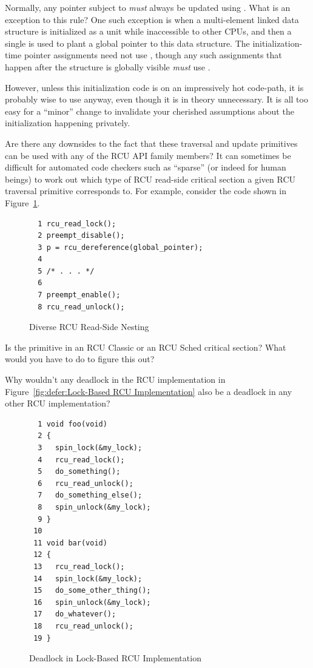 \QuickQ{}
	Normally, any pointer subject to  \emph{must}
	always be updated using .
	What is an exception to this rule?
\QuickA{}
	One such exception is when a multi-element linked
	data structure is initialized as a unit while inaccessible to other
	CPUs, and then a single  is used
	to plant a global pointer to this data structure.
	The initialization-time pointer assignments need not use
	, though any such assignments that
	happen after the structure is globally visible \emph{must} use
	.

	However, unless this initialization code is on an impressively hot
	code-path, it is probably wise to use 
	anyway, even though it is in theory unnecessary.
	It is all too easy for a ``minor'' change to invalidate your cherished
	assumptions about the initialization happening privately.

\QuickQ{}
	Are there any downsides to the fact that these traversal and update
	primitives can be used with any of the RCU API family members?
\QuickA{}
	It can sometimes be difficult for automated
	code checkers such as ``sparse'' (or indeed for human beings) to
	work out which type of RCU read-side critical section a given
	RCU traversal primitive corresponds to.
	For example, consider the code shown in
	Figure~\ref{fig:defer:Diverse RCU Read-Side Nesting}.

\begin{figure}[htbp]
{ \centering
\begin{verbatim}
  1 rcu_read_lock();
  2 preempt_disable();
  3 p = rcu_dereference(global_pointer);
  4
  5 /* . . . */
  6
  7 preempt_enable();
  8 rcu_read_unlock();
\end{verbatim}
}
\caption{Diverse RCU Read-Side Nesting}
\label{fig:defer:Diverse RCU Read-Side Nesting}
\end{figure}

	Is the  primitive in an RCU Classic
	or an RCU Sched critical section?
	What would you have to do to figure this out?

\QuickQ{}
	Why wouldn't any deadlock in the RCU implementation in
	Figure~\ref{fig:defer:Lock-Based RCU Implementation}
	also be a deadlock in any other RCU implementation?
\QuickA{}

\begin{figure}[tbp]
{ \scriptsize
\begin{verbatim}
  1 void foo(void)
  2 {
  3   spin_lock(&my_lock);
  4   rcu_read_lock();
  5   do_something();
  6   rcu_read_unlock();
  7   do_something_else();
  8   spin_unlock(&my_lock);
  9 }
 10
 11 void bar(void)
 12 {
 13   rcu_read_lock();
 14   spin_lock(&my_lock);
 15   do_some_other_thing();
 16   spin_unlock(&my_lock);
 17   do_whatever();
 18   rcu_read_unlock();
 19 }
\end{verbatim}
}
\caption{Deadlock in Lock-Based RCU Implementation}
\label{fig:defer:Deadlock in Lock-Based RCU Implementation}
\end{figure}

